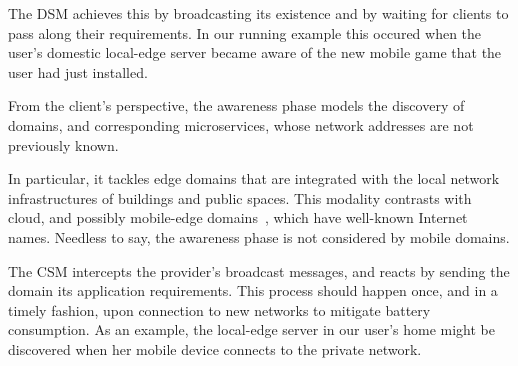 The DSM achieves this by broadcasting its existence and by waiting for clients to pass along their requirements. In our running example this occured when the user's domestic local-edge server became aware of the new mobile game that the user had just installed. 



From the client's perspective, the awareness phase models the discovery of domains, and corresponding microservices, whose network addresses are not previously known. 

In particular, it tackles edge domains that are integrated with the local network infrastructures of buildings and public spaces. This modality contrasts with cloud, and possibly mobile-edge domains~\cite{ahmed2016isco}, which have well-known Internet names. Needless to say, the awareness phase is not considered by mobile domains.

The CSM intercepts the provider's broadcast messages, and reacts by sending the domain its application requirements. This process should happen once, and in a timely fashion, upon connection to new networks to mitigate battery consumption. As an example, the local-edge server in our user's home might be discovered when her mobile device connects to the private network. 




